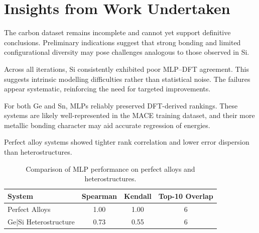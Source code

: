 \section{Insights from Work Undertaken} \label{section:insights_from_work}

The carbon dataset remains incomplete and cannot yet support definitive conclusions. Preliminary indications suggest that strong bonding and limited configurational diversity may pose challenges analogous to those observed in Si.

Across all iterations, Si consistently exhibited poor MLP--DFT agreement. This suggests intrinsic modelling difficulties rather than statistical noise. The failures appear systematic, reinforcing the need for targeted improvements.

For both Ge and Sn, MLPs reliably preserved DFT-derived rankings. These systems are likely well-represented in the MACE training dataset, and their more metallic bonding character may aid accurate regression of energies.

Perfect alloy systems showed tighter rank correlation and lower error dispersion than heterostructures.

\begin{table}[h]
    \centering
    \caption{Comparison of MLP performance on perfect alloys and heterostructures.}
    \begin{tabular}{lccc}
        System & Spearman & Kendall & Top-10 Overlap \\
        \hline
        Perfect Alloys & 1.00 & 1.00 & 6 \\
        Ge|Si Heterostructure & 0.73 & 0.55 & 6 \\
    \end{tabular}
\end{table}
